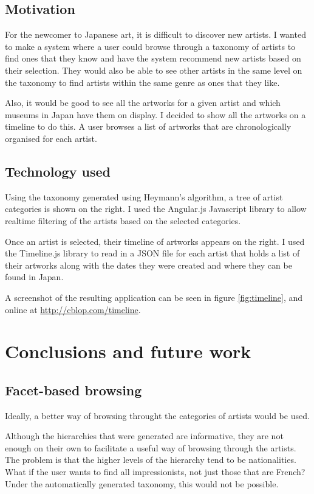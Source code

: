 \documentclass[11pt]{article}
\begin{document}
\subsection{Motivation}
For the newcomer to Japanese art, it is difficult to discover new artists. I wanted to make a system where a user could browse through a taxonomy of artists to find ones that they know and have the system recommend new artists based on their selection. They would also be able to see other artists in the same level on the taxonomy to find artists within the same genre as ones that they like.

Also, it would be good to see all the artworks for a given artist and which museums in Japan have them on display. I decided to show all the artworks on a timeline to do this. A user browses a list of artworks that are chronologically organised for each artist.

\subsection{Technology used}
Using the taxonomy generated using Heymann's algorithm, a tree of artist categories is shown on the right. I used the Angular.js Javascript library to allow realtime filtering of the artists based on the selected categories.

Once an artist is selected, their timeline of artworks appears on the right. I used the Timeline.js library to read in a JSON file for each artist that holds a list of their artworks along with the dates they were created and where they can be found in Japan.

A screenshot of the resulting application can be seen in figure \ref{fig:timeline}, and online at \url{http://cblop.com/timeline}.

\section{Conclusions and future work}
\subsection{Facet-based browsing}
Ideally, a better way of browsing throught the categories of artists would be used.

Although the hierarchies that were generated are informative, they are not enough on their own to facilitate a useful way of browsing through the artists. The problem is that the higher levels of the hierarchy tend to be nationalities. What if the user wants to find all impressionists, not just those that are French? Under the automatically generated taxonomy, this would not be possible.
\end{document}
